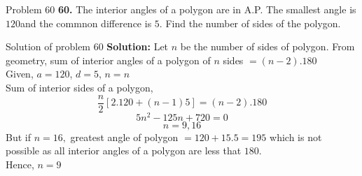 \documentclass[aspectratio=1610,8pt]{beamer}
\begin{document}
\begin{frame}{Problem 60}
  \textbf{60.} The interior angles of a polygon are in A.P. The smallest angle
  is $120$\textdegree and the commnon difference is $5$\textdegree. Find the
  number of sides of the polygon.
\end{frame}
\begin{frame}{Solution of problem 60}
  \textbf{Solution:} Let $n$ be the number of sides of polygon. From geometry,
  sum of interior angles of a polygon of $n$ sides $= (n - 2).180$\textdegree\\
  Given, $a = 120$\textdegree, $d = 5$\textdegree, $n = n$\\
  Sum of interior sides of a polygon,
  $$\frac{n}{2}[2.120 + (n - 1)5] = (n - 2).180$$
  $$5n^2 - 125n + 720 = 0$$
  $$n = 9, 16$$
  But if $n = 16,$ greatest angle of polygon $= 120 + 15.5 = 195$\textdegree
  which is not possible as all interior angles of a polygon are less that
  $180$\textdegree.\\
  Hence, $n = 9$
\end{frame}
\end{document}
